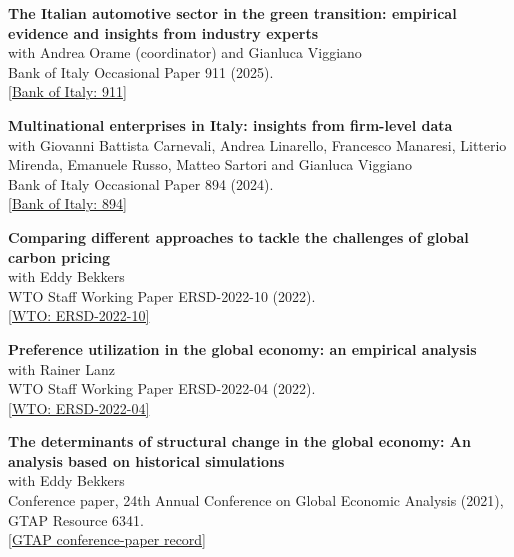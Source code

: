 \documentclass[11pt,a4paper]{article}
\begin{document}
\noindent\begin{minipage}{\linewidth}
\textbf{The Italian automotive sector in the green transition: empirical evidence and insights from industry experts}\\
with Andrea Orame (coordinator) and Gianluca Viggiano\\
Bank of Italy Occasional Paper 911 (2025).\\
\href{https://www.bancaditalia.it/pubblicazioni/qef/2025-0911/index.html?com.dotmarketing.htmlpage.language=1}{[Bank of Italy: 911]}
\end{minipage}\par\medskip
\noindent\begin{minipage}{\linewidth}
\textbf{Multinational enterprises in Italy: insights from firm-level data}\\
with Giovanni Battista Carnevali, Andrea Linarello, Francesco Manaresi, Litterio Mirenda, Emanuele Russo, Matteo Sartori and Gianluca Viggiano\\
Bank of Italy Occasional Paper 894 (2024).\\
\href{https://www.bancaditalia.it/pubblicazioni/qef/2024-0894/index.html?com.dotmarketing.htmlpage.language=1}{[Bank of Italy: 894]}
\end{minipage}\par\medskip
\noindent\begin{minipage}{\linewidth}
\textbf{Comparing different approaches to tackle the challenges of global carbon pricing}\\
with Eddy Bekkers\\
WTO Staff Working Paper ERSD-2022-10 (2022).\\
\href{https://www.wto.org/english/res_e/reser_e/ersd202210_e.htm}{[WTO: ERSD-2022-10]}
\end{minipage}\par\medskip
\noindent\begin{minipage}{\linewidth}
\textbf{Preference utilization in the global economy: an empirical analysis}\\
with Rainer Lanz\\
WTO Staff Working Paper ERSD-2022-04 (2022).\\
\href{https://www.wto.org/english/res_e/reser_e/ersd202204_e.htm}{[WTO: ERSD-2022-04]}
\end{minipage}\par\medskip
\noindent\begin{minipage}{\linewidth}
\textbf{The determinants of structural change in the global economy: An analysis based on historical simulations}\\
with Eddy Bekkers\\
Conference paper, 24th Annual Conference on Global Economic Analysis (2021), GTAP Resource 6341.\\
\href{https://www.gtap.agecon.purdue.edu/resources/res_display.asp?RecordID=6341}{[GTAP conference-paper record]}
\end{minipage}\par\medskip
\end{document}
